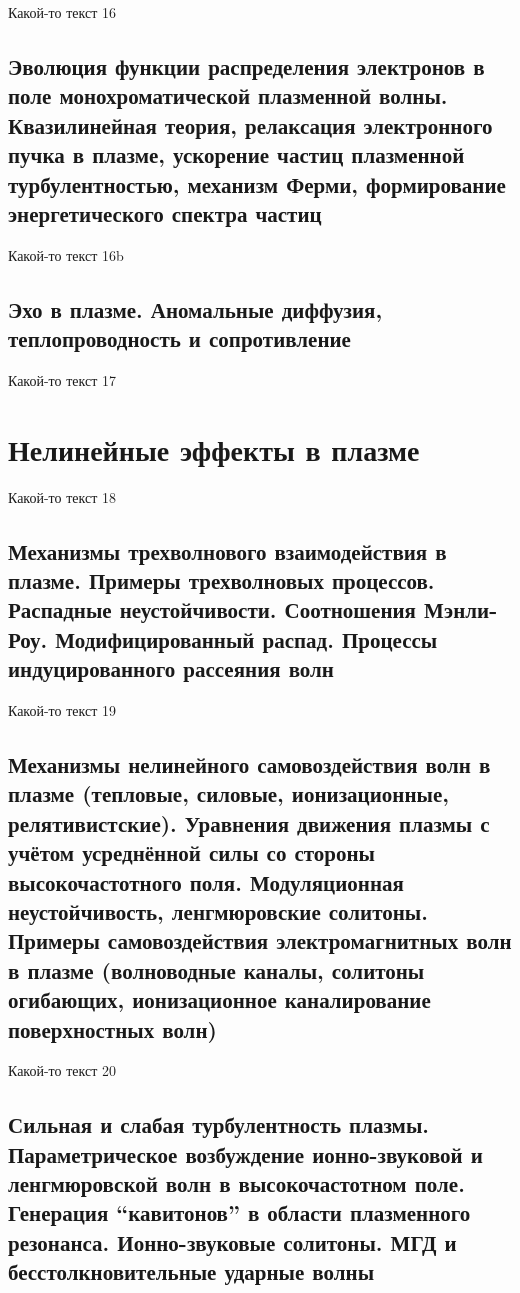 \documentclass[10pt, a4paper]{article}
\numberwithin{equation}{section}
\begin{document}
Какой-то текст 16

\subsection{Эволюция функции распределения электронов в поле монохроматической плазменной волны. Квазилинейная теория, релаксация электронного пучка в плазме, ускорение частиц 	плазменной турбулентностью, механизм Ферми, формирование энергетического спектра частиц}

Какой-то текст 16b

\subsection{Эхо в плазме. Аномальные диффузия, теплопроводность и сопротивление}

Какой-то текст 17

\section{Нелинейные эффекты в плазме}

Какой-то текст 18

\subsection{Механизмы трехволнового взаимодействия в плазме. Примеры трехволновых процессов. Распадные неустойчивости. Соотношения Мэнли-Роу. Модифицированный распад. Процессы индуцированного рассеяния волн}

Какой-то текст 19

\subsection{Механизмы нелинейного самовоздействия волн в плазме (тепловые, силовые, ионизационные, релятивистские). Уравнения движения плазмы с учётом усреднённой силы со стороны высокочастотного поля. Модуляционная неустойчивость, ленгмюровские солитоны. Примеры самовоздействия электромагнитных волн в плазме (волноводные каналы, солитоны огибающих, ионизационное каналирование поверхностных волн)}

Какой-то текст 20

\subsection{Сильная и слабая турбулентность плазмы. Параметрическое возбуждение ионно-звуковой и ленгмюровской волн в высокочастотном поле. Генерация “кавитонов” в области плазменного резонанса. Ионно-звуковые солитоны. МГД и бесстолкновительные ударные волны}
\end{document}
